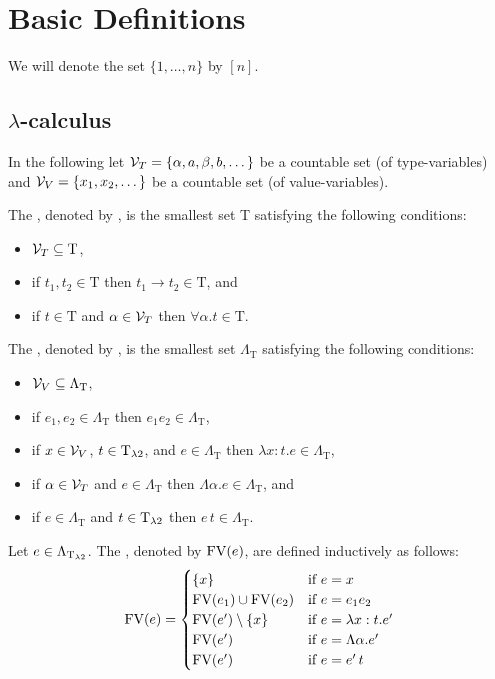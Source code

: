 \section{Basic Definitions}
We will denote the set $\{1,\dots,n\}$ by $\left[n\right]$.
\subsection{$\lambda$-calculus \lambdaTwo}
In the following let $\mathcal{V}_T=\{\alpha,a,\beta,b,\dots\}$ be a countable set (of type-variables) and $\mathcal{V}_V=\{x_1,x_2,\dots\}$ be a countable set (of value-variables).
\begin{definition}
	The , denoted by \lambdaTypes{}, is the smallest set T satisfying the following conditions:
	\begin{itemize}
		\item $\mathcal{V}_T\subseteq\text{T}$,
		\item if $t_1,t_2\in\text{T}$ then $t_1\to t_2\in\text{T}$, and
		\item if $t\in\text{T}$ and $\alpha\in\mathcal{V}_T$ then $\forall\alpha.t\in\text{T}$.
	\end{itemize}
	
	The , denoted by \lambdaTerms{}, is the smallest set $\Lambda_\text{T}$ satisfying the following conditions: %
	\begin{itemize}
		\item $\mathcal{V}_V\subseteq\Lambda_\text{T}$,
		\item if $e_1,e_2\in\Lambda_\text{T}$ then $e_1e_2\in\Lambda_\text{T}$,
		\item if $x\in\mathcal{V}_V$, $t\in\text{T}_{\lambda2}$, and $e\in\Lambda_\text{T}$ then $\lambda x:t.e\in\Lambda_\text{T}$,
		\item if $\alpha\in\mathcal{V}_T$ and $e\in\Lambda_\text{T}$ then $\Lambda \alpha.e\in\Lambda_\text{T}$, and
		\item if $e\in\Lambda_\text{T}$ and $t\in\text{T}_{\lambda2}$ then $e\,t\in\Lambda_\text{T}$.
	\end{itemize}
\end{definition}
\begin{definition}
	Let $e\in\Lambda_{\text{T}_{\lambda2}}$. The , denoted by $\text{FV}(e)$, are defined inductively as follows:
	\[\FV(e)=
		\begin{cases}
			\{x\}                 & \text{if $e=x$}                \\ %
			\FV(e_1)\cup\FV(e_2)  & \text{if $e=e_1e_2$}           \\
			\FV(e')\setminus\{x\} & \text{if $e=\lambda x:t.e'$}   \\
			\FV(e')               & \text{if $e=\Lambda\alpha.e'$} \\
			\FV(e')               & \text{if $e=e'\,t$}            \\
		\end{cases}\]
\end{definition}

